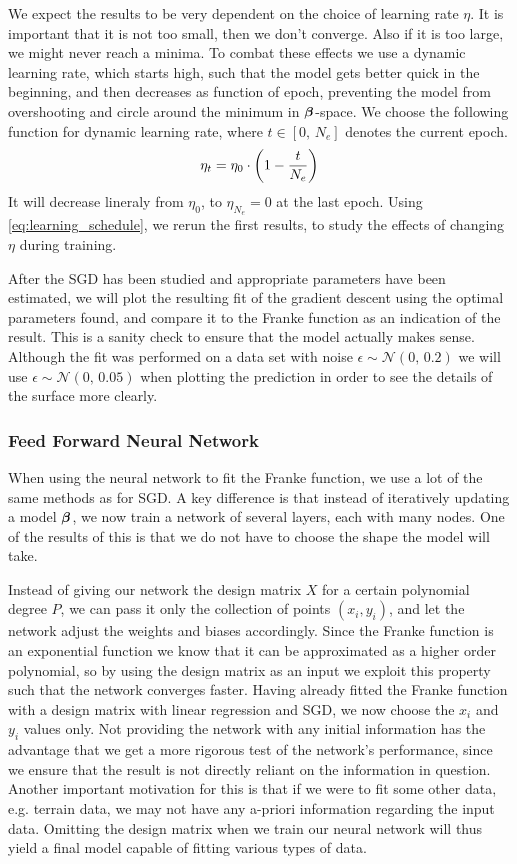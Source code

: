 \documentclass[12pt]{extarticle}
\begin{document}
We expect the results to be very dependent on the choice of learning rate $\eta$. It is important that it is not too small, then we don't converge. Also if it is too large, we might never reach a minima. To combat these effects we use a dynamic learning rate, which starts high, such that the model gets better quick in the beginning, and then decreases as function of epoch, preventing the model from overshooting and circle around the minimum in $\boldsymbol{\beta}$-space. We choose the following function for dynamic learning rate, where $t\in[0, \, N_e]$ denotes the current epoch.
\begin{align} \label{eq:learning_schedule}
	\eta_t = \eta_0 \cdot \left( 1 - \frac{t}{N_e} \right)
\end{align}
It will decrease lineraly from $\eta_0$, to $\eta_{N_e}=0$ at the last epoch.
Using \eqref{eq:learning_schedule}, we rerun the first results, to study the effects of changing $\eta$ during training.

After the SGD has been studied and appropriate parameters have been estimated, we will plot the resulting fit of the gradient descent using the optimal parameters found, and compare it to the Franke function as an indication of the result. This is a sanity check to ensure that the model actually makes sense. Although the fit was performed on a data set with noise $\epsilon\sim\mathcal{N}(0,\,0.2)$ we will use $\epsilon\sim\mathcal{N}(0,\,0.05)$ when plotting the prediction in order to see the details of the surface more clearly.


\subsubsection{Feed Forward Neural Network}
When using the neural network to fit the Franke function, we use a lot of the same methods as for SGD. A key difference is that instead of iteratively updating a model $\boldsymbol{\beta}$, we now train a network of several layers, each with many nodes. One of the results of this is that we do not have to choose the shape the model will take.

Instead of giving our network the design matrix $X$ for a certain polynomial degree $P$, we can pass it only the collection of points $(x_i, y_i)$, and let the network adjust the weights and biases accordingly. Since the Franke function is an exponential function we know that it can be approximated as a higher order polynomial, so by using the design matrix as an input we exploit this property such that the network converges faster. Having already fitted the Franke function with a design matrix with linear regression and SGD, we now choose the $x_i$ and $y_i$ values only. Not providing the network with any initial information has the advantage that we get a more rigorous test of the network's performance, since we ensure that the result is not directly reliant on the information in question. Another important motivation for this is that if we were to fit some other data, e.g. terrain data, we may not have any a-priori information regarding the input data. Omitting the design matrix when we train our neural network will thus yield a final model capable of fitting various types of data.
\end{document}
